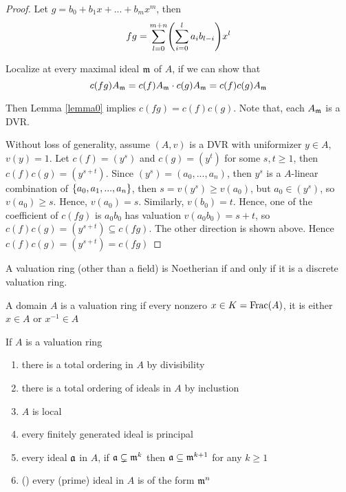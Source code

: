 \begin{proof}
	Let $g = b_0 + b_1 x + ... + b_m x^m$, then
	$$
		fg = \sum_{l=0}^{m+n} \tuple*{\sum_{i=0}^l a_i b_{l-i}} x^l
	$$
	
	Localize at every maximal ideal $\mathfrak{m}$ of $A$, if we can show that
	$$
		c(fg) A_{\mathfrak{m}} = c(f) A_{\mathfrak{m}} \cdot  c(g) A_{\mathfrak{m}} = c(f) c(g) A_{\mathfrak{m}}
	$$
	
	Then Lemma \ref{lemma0} implies $c(fg) = c(f) c(g)$. Note that, each $A_{\mathfrak{m}}$ is a DVR.
	
	Without loss of generality, assume $(A, v)$ is a DVR with uniformizer $y \in A$, $v(y) = 1$. Let $c(f) = (y^s)$ and $c(g) = (y^t)$ for some $s, t \geq 1$, then $c(f) c(g) = (y^{s+t})$. Since $(y^s) = (a_0, ..., a_n)$, then $y^s$ is a $A$-linear combination of $\{a_0, a_1, ..., a_n\}$, then $s = v(y^s) \geq v(a_0)$, but $a_0 \in (y^s)$, so $v(a_0) \geq s$. Hence, $v(a_0) = s$. Similarly, $v(b_0) = t$. Hence, one of the coefficient of $c(fg)$ is $a_0 b_0$ has valuation $v(a_0 b_0) = s+t$, so $c(f) c(g) = (y^{s+t}) \subseteq c(fg)$. The other direction is shown above. Hence $c(f) c(g) = (y^{s+t}) = c(fg)$
\end{proof}

\begin{problem}
	A valuation ring (other than a field) is Noetherian if and only if it is a discrete valuation ring.
\end{problem}

\begin{definition}
	A domain $A$ is a valuation ring if every nonzero $x \in K = \operatorname{Frac}(A)$, it is either $x \in A$ or $x^{-1} \in A$
\end{definition}

\begin{lemma}
	\label{lemma1}
	If $A$ is a valuation ring
	\begin{enumerate}
		\item there is a total ordering in $A$ by divisibility
		\item there is a total ordering of ideals in $A$ by inclustion
		\item $A$ is local
		\item every finitely generated ideal is principal
		\item every ideal $\mathfrak{a}$ in $A$, if $\mathfrak{a} \subsetneq \mathfrak{m}^k$ then $\mathfrak{a} \subseteq \mathfrak{m}^{k+1}$ for any $k \geq 1$
		\item () every (prime) ideal in $A$ is of the form $\mathfrak{m}^n$
	\end{enumerate}
\end{lemma}


